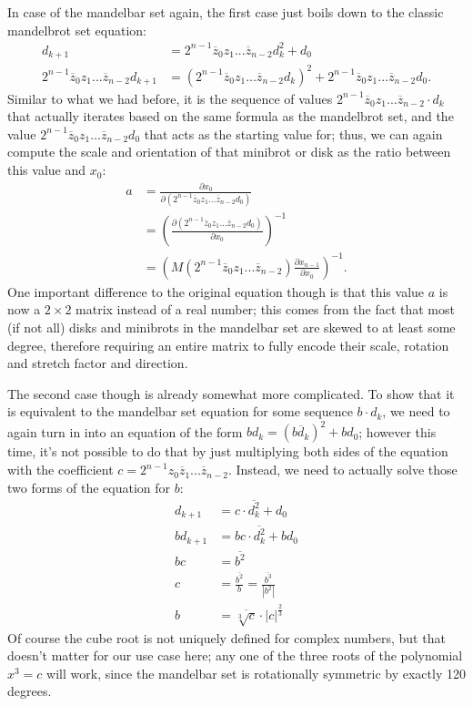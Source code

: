 \documentclass[12pt,a4paper]{article}
\newcommand{\jmat}[2]{\frac{\partial #1}{\partial #2}}
\begin{document}
In case of the mandelbar set again, the first case just boils down to the classic mandelbrot set equation:
\begin{align*}
	d_{k+1} &= 2^{n-1}\overline{z}_0z_1...\overline{z}_{n-2}d_k^2+d_0\\
	2^{n-1}\overline{z}_0z_1...\overline{z}_{n-2}d_{k+1} &= (2^{n-1}\overline{z}_0z_1...\overline{z}_{n-2}d_k)^2+2^{n-1}\overline{z}_0z_1...\overline{z}_{n-2}d_0.
\end{align*}
Similar to what we had before, it is the sequence of values $2^{n-1}\overline{z}_0z_1...\overline{z}_{n-2}\cdot d_k$ that actually iterates based on the same formula as the mandelbrot set, and the value $2^{n-1}\overline{z}_0z_1...\overline{z}_{n-2}d_0$ that acts as the starting value for; thus, we can again compute the scale and orientation of that minibrot or disk as the ratio between this value and $x_0$:
\begin{align*}
	a &= \jmat{x_0}{(2^{n-1}\overline{z}_0z_1...\overline{z}_{n-2}d_0)}\\
	&= \left(\jmat{(2^{n-1}\overline{z}_0z_1...\overline{z}_{n-2}d_0)}{x_0}\right)^{-1}\\
	&= \left(M(2^{n-1}\overline{z}_0z_1...\overline{z}_{n-2})\jmat{x_{n-1}}{x_0}\right)^{-1}.
\end{align*}
One important difference to the original equation though is that this value $a$ is now a $2\times2$ matrix instead of a real number; this comes from the fact that most (if not all) disks and minibrots in the mandelbar set are skewed to at least some degree, therefore requiring an entire matrix to fully encode their scale, rotation and stretch factor and direction.

The second case though is already somewhat more complicated. To show that it is equivalent to the mandelbar set equation for some sequence $b\cdot d_k$, we need to again turn in into an equation of the form $bd_k=(\overline{bd_k})^2+bd_0$; however this time, it's not possible to do that by just multiplying both sides of the equation with the coefficient $c=2^{n-1}z_0\overline{z}_1...\overline{z}_{n-2}$. Instead, we need to actually solve those two forms of the equation for $b$:
\begin{align*}
	d_{k+1} &= c\cdot\overline{d_k^2}+d_0\\
	bd_{k+1} &= bc\cdot\overline{d_k^2}+bd_0\\
	bc &= \overline{b^2}\\
	c &= \frac{\overline{b^2}}{b} = \frac{\overline{b^3}}{\left|b^2\right|}\\
	b &= \overline{\sqrt[3]{c}}\cdot\left|c\right|^\frac{2}{3}
\end{align*}
Of course the cube root is not uniquely defined for complex numbers, but that doesn't matter for our use case here; any one of the three roots of the polynomial $x^3=c$ will work, since the mandelbar set is rotationally symmetric by exactly 120 degrees.
\end{document}
